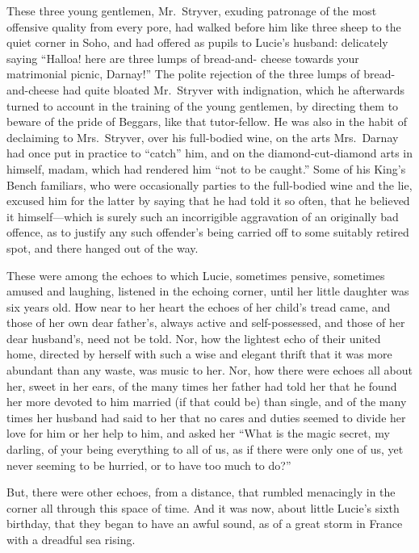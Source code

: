 These three young gentlemen, Mr.\ Stryver, exuding patronage of the most
offensive quality from every pore, had walked before him like three
sheep to the quiet corner in Soho, and had offered as pupils to Lucie's
husband:  delicately saying ``Halloa! here are three lumps of bread-and-%
cheese towards your matrimonial picnic, Darnay!''  The polite rejection
of the three lumps of bread-and-cheese had quite bloated Mr.\ Stryver
with indignation, which he afterwards turned to account in the training
of the young gentlemen, by directing them to beware of the pride of
Beggars, like that tutor-fellow.  He was also in the habit of declaiming
to Mrs.\ Stryver, over his full-bodied wine, on the arts Mrs.\ Darnay had
once put in practice to ``catch'' him, and on the diamond-cut-diamond
arts in himself, madam, which had rendered him ``not to be caught.''
Some of his King's Bench familiars, who were occasionally parties
to the full-bodied wine and the lie, excused him for the latter by saying
that he had told it so often, that he believed it himself---which is
surely such an incorrigible aggravation of an originally bad offence,
as to justify any such offender's being carried off to some suitably
retired spot, and there hanged out of the way.

These were among the echoes to which Lucie, sometimes pensive,
sometimes amused and laughing, listened in the echoing corner, until
her little daughter was six years old.  How near to her heart the echoes
of her child's tread came, and those of her own dear father's, always
active and self-possessed, and those of her dear husband's, need not
be told.  Nor, how the lightest echo of their united home, directed
by herself with such a wise and elegant thrift that it was more
abundant than any waste, was music to her.  Nor, how there were echoes
all about her, sweet in her ears, of the many times her father had
told her that he found her more devoted to him married (if that could be)
than single, and of the many times her husband had said to her that no
cares and duties seemed to divide her love for him or her help to him,
and asked her ``What is the magic secret, my darling, of your being
everything to all of us, as if there were only one of us,
yet never seeming to be hurried, or to have too much to do?''

But, there were other echoes, from a distance, that rumbled menacingly
in the corner all through this space of time.  And it was now, about
little Lucie's sixth birthday, that they began to have an awful sound,
as of a great storm in France with a dreadful sea rising.

